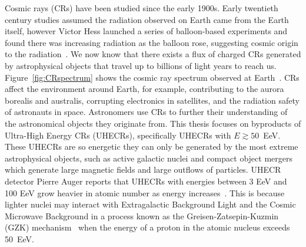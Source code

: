   Cosmic rays (CRs) have been studied since the early 1900s. 
  Early twentieth century studies assumed the radiation observed on Earth came from the Earth itself, however Victor Hess launched a series of balloon-based experiments and found there was increasing radiation as the balloon rose, suggesting cosmic origin to the radiation~\citep{cr_hess}.
  We now know that there exists a flux of charged CRs generated by astrophysical objects that travel up to billions of light years to reach us.
  Figure~\ref{fig:CRspectrum} shows the cosmic ray spectrum observed at Earth~\citep{snowmass_cr}. 
  CRs affect the environment around Earth, for example, contributing to the aurora borealis and australis, corrupting electronics in satellites, and the radiation safety of astronauts in space. 
  Astronomers use CRs to further their understanding of the astronomical objects they originate from.  
  This thesis focuses on byproducts of Ultra-High Energy CRs (UHECRs), specifically UHECRs with $E\gtrsim 50$~EeV.
  These UHECRs are so energetic they can only be generated by the most extreme astrophysical objects, such as active galactic nuclei and compact object mergers which generate large magnetic fields and large outflows of particles.
  UHECR detector Pierre Auger reports that UHECRs with energies between 3 EeV and 100 EeV grow heavier in atomic number as energy increases~\citep{pao_mass_composition}.
  This is because lighter nuclei may interact with Extragalactic Background Light and the Cosmic Microwave Background in a process known as the Greisen-Zatsepin-Kuzmin (GZK) mechanism~\citep{gzk-gk, gzk-z} when the energy of a proton in the atomic nucleus exceeds 50~EeV.
  \begin{center}
    \label{fey:gzk}
  \end{center}
  
